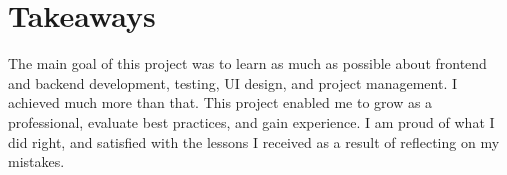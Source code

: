 \section{Takeaways}\label{sec:takeaways}

The main goal of this project
was to learn as much as possible about
frontend and backend development,
testing,
\ac{UI} design, and
project management.
I achieved much more than that.
This project enabled me to grow as a professional,
evaluate best practices,
and gain experience.
I am proud of what I did right,
and satisfied with the lessons
I received as a result of reflecting on my mistakes.




